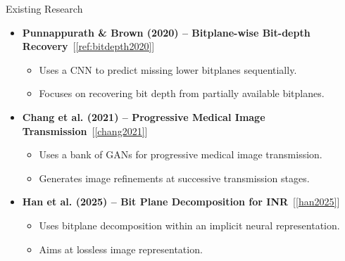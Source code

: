 \documentclass[aspectratio=169, 11pt]{beamer}
\begin{document}
\begin{frame}{Existing Research}
\small
\begin{itemize}
    \item \textbf{Punnappurath \& Brown (2020) -- Bitplane-wise Bit-depth Recovery}~[\ref{ref:bitdepth2020}]
    \begin{itemize}
        \item Uses a CNN to predict missing lower bitplanes sequentially.
        \item Focuses on recovering bit depth from partially available bitplanes.
    \end{itemize}

    \vspace{0.2cm}
    \item \textbf{Chang et al. (2021) -- Progressive Medical Image Transmission}~[\ref{chang2021}]
    \begin{itemize}
        \item Uses a bank of GANs for progressive medical image transmission.
        \item Generates image refinements at successive transmission stages.
    \end{itemize}

    \vspace{0.2cm}
    \item \textbf{Han et al. (2025) -- Bit Plane Decomposition for INR}~[\ref{han2025}]
    \begin{itemize}
        \item Uses bitplane decomposition within an implicit neural representation.
        \item Aims at lossless image representation.
    \end{itemize}

\end{itemize}
\end{frame}
\end{document}
